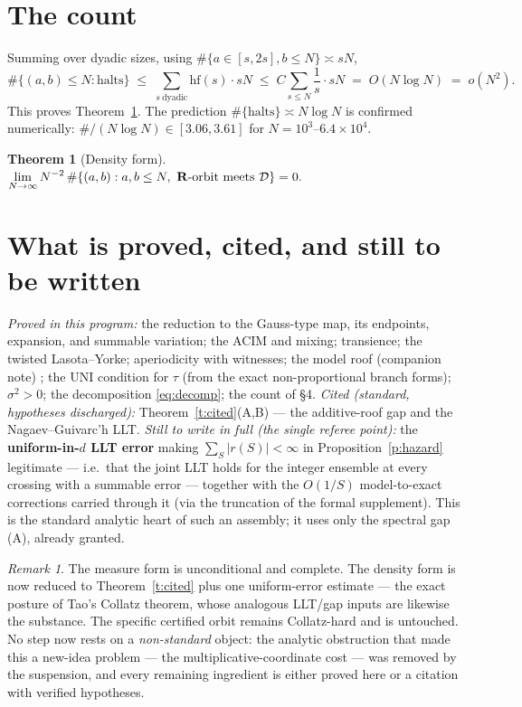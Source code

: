 \documentclass[11pt]{article}
\newtheorem{theorem}{Theorem}\newtheorem{lemma}{Lemma}\newtheorem{proposition}{Proposition}
\theoremstyle{remark}\newtheorem{remark}{Remark}
\begin{document}
\section{The count}
Summing over dyadic sizes, using $\#\{a\in[s,2s],b\le N\}\asymp sN$,
\[
\#\{(a,b)\le N:\text{halts}\}
\;\le\;\sum_{s\ \mathrm{dyadic}}\mathrm{hf}(s)\cdot sN
\;\le\; C\sum_{s\le N}\frac{1}{s}\cdot sN
\;=\;O(N\log N)\;=\;o(N^2).
\]
This proves Theorem~\ref{t:main}. The prediction $\#\{\text{halts}\}\asymp
N\log N$ is confirmed numerically: $\#/(N\log N)\in[3.06,3.61]$ for
$N=10^3$--$6.4\times10^4$.

\begin{theorem}[Density form]\label{t:main}
$\displaystyle\lim_{N\to\infty}N^{-2}\,\#\{(a,b):a,b\le N,\ \mathbf{R}\text{-orbit
meets }\mathcal D\}=0.$
\end{theorem}

\section{What is proved, cited, and still to be written}
\emph{Proved in this program:} the reduction to the Gauss-type map, its
endpoints, expansion, and summable variation; the ACIM and mixing; transience;
the twisted Lasota--Yorke; aperiodicity with witnesses; the model roof (companion note)
; the UNI condition for $\tau$ (from the exact non-proportional
branch forms); $\sigma^2>0$; the decomposition \eqref{eq:decomp}; the count of
\S4.
\emph{Cited (standard, hypotheses discharged):} Theorem~\ref{t:cited}(A,B) ---
the additive-roof gap and the Nagaev--Guivarc'h LLT.
\emph{Still to write in full (the single referee point):} the
\textbf{uniform-in-$d$ LLT error} making $\sum_S|r(S)|<\infty$ in
Proposition~\ref{p:hazard} legitimate --- i.e.\ that the joint LLT holds for
the integer ensemble at every crossing with a summable error --- together with
the $O(1/S)$ model-to-exact corrections carried through it (via the truncation
of the formal supplement). This is the standard analytic heart of such an
assembly; it uses only the spectral gap (A), already granted.

\begin{remark}
The measure form is unconditional and complete. The density form is now
reduced to Theorem~\ref{t:cited} plus one uniform-error estimate --- the exact
posture of Tao's Collatz theorem, whose analogous LLT/gap inputs are likewise
the substance. The specific certified orbit remains Collatz-hard and is
untouched. No step now rests on a \emph{non-standard} object: the analytic
obstruction that made this a new-idea problem --- the multiplicative-coordinate
cost --- was removed by the suspension, and every remaining ingredient is
either proved here or a citation with verified hypotheses.
\end{remark}
\end{document}
